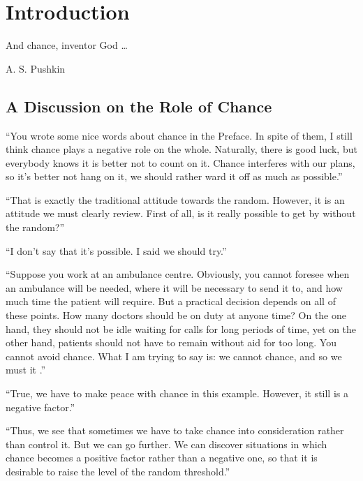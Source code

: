 \chapter*{Introduction}
\label{ch-intro}

\epigraph{And chance, inventor God \ldots}{A. S. Pushkin}

\section*{A Discussion on the Role of Chance}


\begin{dialogue}
 \athr ``You wrote some nice words about chance in the Preface. In spite of them, I still think chance plays a negative role on the whole. Naturally, there is good luck, but everybody knows it is better not to count on it. Chance interferes with our plans, so it's better not hang on it, we should rather ward it off as much as possible.''

  \athr ``That is exactly the traditional attitude towards the random. However, it is an attitude we must clearly review. First of all, is it really possible to get by without the random?''

\rdr ``I don't say that it's possible. I said we should try.''

  \athr ``Suppose you work at an ambulance centre. Obviously, you cannot foresee when an ambulance will be needed, where it will be necessary to send it to, and how much time the patient will require. But a practical decision depends on all of these points. How many doctors should be on duty at anyone time? On the one hand, they should not be idle waiting for calls for long periods of time, yet on the other hand,  patients should not have to remain without aid for too long. You cannot avoid chance. What I am trying to say is: we cannot  chance, and so we must  it .''


\rdr ``True, we have to make peace with chance in this
  example. However, it still is a negative factor.''

\athr ``Thus, we see that sometimes we have to take
  chance into consideration rather than control it. But we can go
  further. We can discover situations in which chance becomes a
  positive factor rather than a negative one, so that it is desirable
  to raise the level of the random threshold.''


\end{dialogue}
